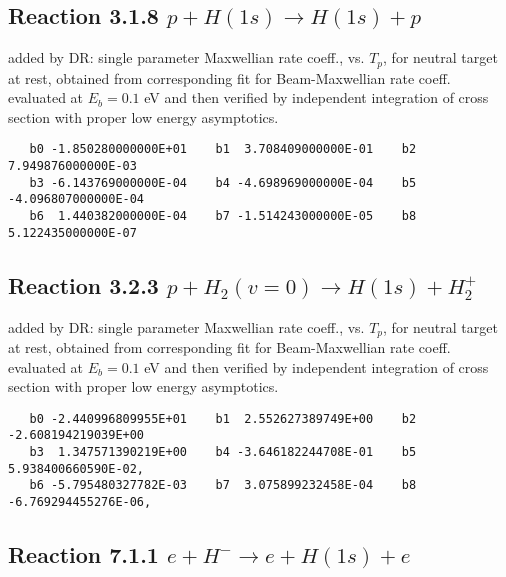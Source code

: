 \documentclass[12pt,dvipdfm]{article}
\begin{document}
\newpage

\subsection{
Reaction 3.1.8 $  p + H(1s) \rightarrow H(1s) + p$}

added by DR: single parameter Maxwellian rate coeff., vs. $T_p$, for neutral target at rest,
obtained from corresponding fit for Beam-Maxwellian rate coeff. evaluated at $E_b =0.1$ eV
and then verified by independent integration of cross section with proper low energy asymptotics.

\begin{small}\begin{verbatim}
   b0 -1.850280000000E+01    b1  3.708409000000E-01    b2  7.949876000000E-03
   b3 -6.143769000000E-04    b4 -4.698969000000E-04    b5 -4.096807000000E-04
   b6  1.440382000000E-04    b7 -1.514243000000E-05    b8  5.122435000000E-07
\end{verbatim}\end{small}

\subsection{
Reaction 3.2.3 $  p + H_2(v=0) \rightarrow H(1s) + H_2^+$}

added by DR: single parameter Maxwellian rate coeff., vs. $T_p$, for neutral target at rest,
obtained from corresponding fit for Beam-Maxwellian rate coeff. evaluated at $E_b =0.1$ eV
and then verified by independent integration of cross section with proper low energy asymptotics.

\begin{small}\begin{verbatim}
   b0 -2.440996809955E+01    b1  2.552627389749E+00    b2 -2.608194219039E+00
   b3  1.347571390219E+00    b4 -3.646182244708E-01    b5  5.938400660590E-02,
   b6 -5.795480327782E-03    b7  3.075899232458E-04    b8 -6.769294455276E-06,

\end{verbatim}\end{small}

\newpage




\subsection{
Reaction 7.1.1 $   e + H^- \rightarrow e + H(1s) + e$}
\end{document}
